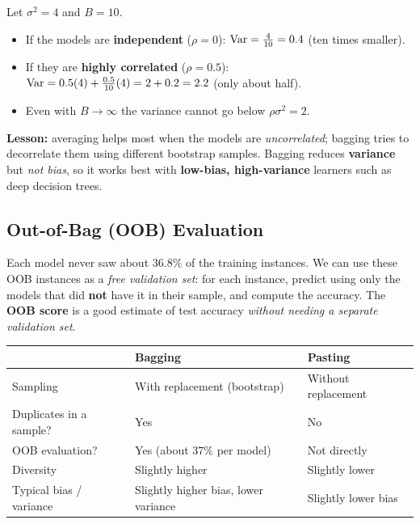 \begin{example}
Let $\sigma^2=4$ and $B=10$.
\begin{itemize}
  \item If the models are \textbf{independent} ($\rho=0$): $\operatorname{Var}=\frac{4}{10}=0.4$ (ten times smaller).
  \item If they are \textbf{highly correlated} ($\rho=0.5$): $\operatorname{Var}=0.5(4)+\frac{0.5}{10}(4)=2+0.2=2.2$ (only about half).
  \item Even with $B\to\infty$ the variance cannot go below $\rho\sigma^2=2$.
\end{itemize}
\textbf{Lesson:} averaging helps most when the models are \emph{uncorrelated}; bagging tries to decorrelate them using different bootstrap samples. Bagging reduces \textbf{variance} but \emph{not bias}, so it works best with \textbf{low-bias, high-variance} learners such as deep decision trees.
\end{example}

\subsection{Out-of-Bag (OOB) Evaluation}

Each model never saw about $36.8\%$ of the training instances. We can use these OOB instances as a \emph{free validation set}: for each instance, predict using only the models that did \textbf{not} have it in their sample, and compute the accuracy. The \textbf{OOB score} is a good estimate of test accuracy \emph{without needing a separate validation set}.


\begin{center}
\begin{tabular}{@{}p{3.2cm}p{5.4cm}p{5.4cm}@{}}
\toprule
 & \textbf{Bagging} & \textbf{Pasting}\\
\midrule
Sampling & With replacement (bootstrap) & Without replacement\\
Duplicates in a sample? & Yes & No\\
OOB evaluation? & Yes (about $37\%$ per model) & Not directly\\
Diversity & Slightly higher & Slightly lower\\
Typical bias / variance & Slightly higher bias, lower variance & Slightly lower bias\\
\bottomrule
\end{tabular}
\end{center}

